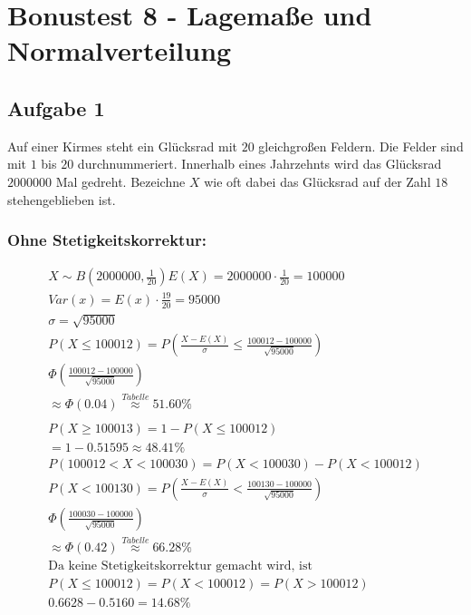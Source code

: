 \chapter{Bonustest 8 -  Lagemaße und Normalverteilung}

\section{Aufgabe 1}

Auf einer Kirmes steht ein Glücksrad mit $20$ gleichgroßen Feldern. Die Felder sind mit $1$ bis $20$ durchnummeriert. Innerhalb eines Jahrzehnts wird das Glücksrad $2000000$ Mal gedreht. Bezeichne $X$ wie oft dabei das Glücksrad auf der Zahl $18$ stehengeblieben ist.

\subsection{Ohne Stetigkeitskorrektur:}

\begin{align*}
    X \sim B(2000000, \frac{1}{20})
    E(X) = 2000000 \cdot \frac{1}{20} = 100000 \\
    Var(x) = E(x) \cdot \frac{19}{20} = 95000 \\
    \sigma = \sqrt{95000} \\
    P(X \leq 100012) = P\left(\frac{X - E(X)}{\sigma} \leq \frac{100012 - 100000}{\sqrt{95000}}\right) \\
    \Phi\left(\frac{100012 - 100000}{\sqrt{95000}}\right) \\
    \approx \Phi(0.04) \overset{Tabelle}{\approx} 51.60\%\\\\
    P(X \geq 100013) = 1 - P(X \leq 100012) \\
    = 1 - 0.51595 \approx 48.41 \% \\
    P(100012 < X < 100030) = P(X < 100030) - P(X < 100012) \\
    P(X < 100130) = P\left(\frac{X - E(X)}{\sigma} < \frac{100130 - 100000}{\sqrt{95000}}\right)\\
    \Phi(\frac{100030 - 100000}{\sqrt{95000}}) \\
    \approx \Phi(0.42) \overset{Tabelle}{\approx} 66.28\% \\
    \text{Da keine Stetigkeitskorrektur gemacht wird, ist } \\
    P(X \leq 100012) = P(X < 100012) = P(X > 100012) \\
    0.6628 - 0.5160 = 14.68\%
\end{align*}

